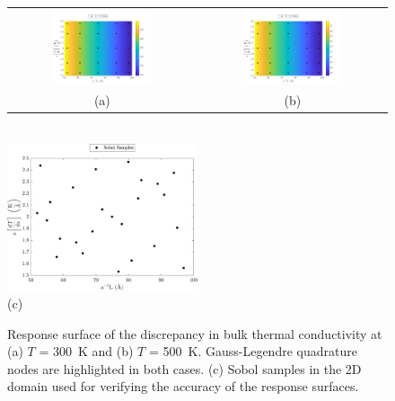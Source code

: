 \begin{figure}[p]
\begin{center}
\begin{tabular}{cc}
 \hspace{-10mm}
  \includegraphics[width=0.55\textwidth]{./Figures/err2D_300}
  &
  \includegraphics[width=0.55\textwidth]{./Figures/err2D_500}
  \\ (a) & (b)
  \end{tabular}
  \\ \vspace{1mm}
  \includegraphics[width=0.50\textwidth]{./Figures/err2D_s}
  \\ (c)
\caption{Response surface of the discrepancy in bulk thermal conductivity at (a) $T$ = 300~K and
 (b) $T$ = 500~K. Gauss-Legendre quadrature nodes are highlighted in both cases. (c) Sobol samples
 in the 2D domain used for verifying the accuracy of the response surfaces.}
\label{fig:rs2}
\end{center}
\end{figure}

